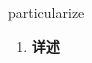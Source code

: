 
\begin{frame}
{\huge particularize}
\begin{center}
\begin{enumerate}\Large
  \item \textbf{详述}
\end{enumerate}
\end{center}
\end{frame}
